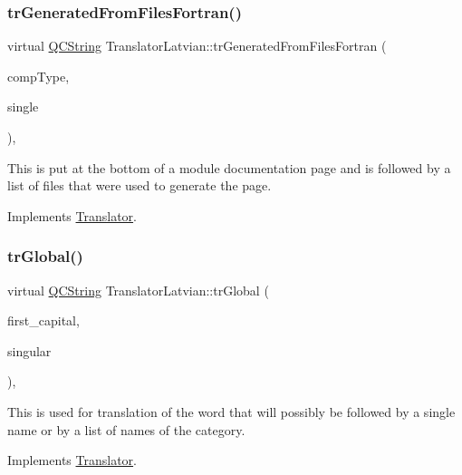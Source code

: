 \subsubsection{\texorpdfstring{trGeneratedFromFilesFortran()}{trGeneratedFromFilesFortran()}}
{\footnotesize\ttfamily virtual \mbox{\hyperlink{class_q_c_string}{Q\+C\+String}} Translator\+Latvian\+::tr\+Generated\+From\+Files\+Fortran (\begin{DoxyParamCaption}\item[{\mbox{\hyperlink{class_class_def_ae70cf86d35fe954a94c566fbcfc87939}{Class\+Def\+::\+Compound\+Type}}}]{comp\+Type,  }\item[{bool}]{single }\end{DoxyParamCaption})\hspace{0.3cm}{\ttfamily [inline]}, {\ttfamily [virtual]}}

This is put at the bottom of a module documentation page and is followed by a list of files that were used to generate the page. 

Implements \mbox{\hyperlink{class_translator}{Translator}}.

\mbox{\label{class_translator_latvian_a69050c0c8a1ac59b3580b741d8e7bb99}} 
\subsubsection{\texorpdfstring{trGlobal()}{trGlobal()}}
{\footnotesize\ttfamily virtual \mbox{\hyperlink{class_q_c_string}{Q\+C\+String}} Translator\+Latvian\+::tr\+Global (\begin{DoxyParamCaption}\item[{bool}]{first\+\_\+capital,  }\item[{bool}]{singular }\end{DoxyParamCaption})\hspace{0.3cm}{\ttfamily [inline]}, {\ttfamily [virtual]}}

This is used for translation of the word that will possibly be followed by a single name or by a list of names of the category. 

Implements \mbox{\hyperlink{class_translator}{Translator}}.

\mbox{\label{class_translator_latvian_ac0d2571ddf076d9e0e2dc4ff808f029a}} 
